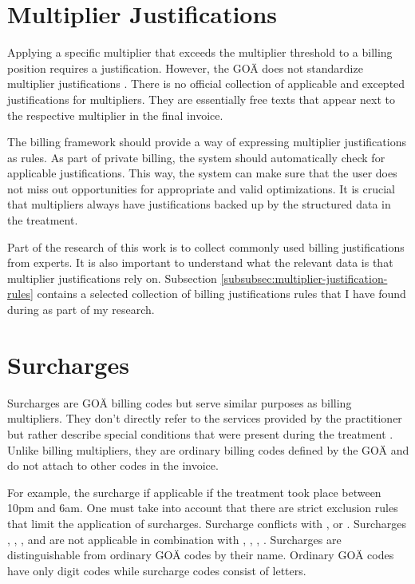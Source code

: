 \section{Multiplier Justifications}\label{sec:multiplier-justifications}
Applying a specific multiplier that exceeds the multiplier threshold to a billing position requires a justification.
However, the GOÄ does not standardize multiplier justifications \cite[]{bruck1998kommentar}.
There is no official collection of applicable and excepted justifications for multipliers.
They are essentially free texts that appear next to the respective multiplier in the final invoice.

The billing framework should provide a way of expressing multiplier justifications as rules.
As part of private billing, the system should automatically check for applicable justifications.
This way, the system can make sure that the user does not miss out opportunities for appropriate and valid optimizations.
It is crucial that multipliers always have justifications backed up by the structured data in the treatment.

Part of the research of this work is to collect commonly used billing justifications from experts.
It is also important to understand what the relevant data is that multiplier justifications rely on.
Subsection \ref{subsubsec:multiplier-justification-rules} contains a selected collection of billing justifications rules that I have found during as part of my research.

\section{Surcharges}\label{sec:surcharges}
Surcharges are GOÄ billing codes but serve similar purposes as billing multipliers.
They don't directly refer to the services provided by the practitioner but rather describe special conditions that were present during the treatment \cite{walter2008abrechnung}.
Unlike billing multipliers, they are ordinary billing codes defined by the GOÄ and do not attach to other codes in the invoice.

For example, the surcharge  if applicable if the treatment took place between 10pm and 6am.
One must take into account that there are strict exclusion rules that limit the application of surcharges\cite{kommentar2012zuschlage}.
Surcharge  conflicts with ,  or .
Surcharges , , ,  and  are not applicable in combination with , , ,  \cite{kommentar2012zuschlage}.
Surcharges are distinguishable from ordinary GOÄ codes by their name.
Ordinary GOÄ codes have only digit codes while surcharge codes consist of letters.

